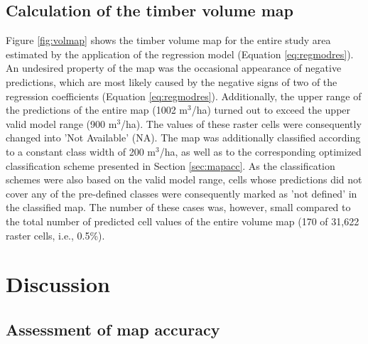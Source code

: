 \subsection{Calculation of the timber volume map}
\label{sec:mapcalc}

Figure \ref{fig:volmap} shows the timber volume map for the entire study area estimated by the application of the regression model (Equation \ref{eq:regmodres}). An undesired property of the map was the occasional appearance of negative predictions, which are most likely caused by the negative signs of two of the regression coefficients (Equation \ref{eq:regmodres}). Additionally, the upper range of the predictions of the entire map (1002 m$^3$/ha) turned out to exceed the upper valid model range (900 m$^3$/ha). The values of these raster cells were consequently changed into 'Not Available' (NA). The map was additionally classified according to a constant class width of 200 m$^3$/ha, as well as to the corresponding optimized classification scheme presented in Section \ref{sec:mapacc}. As the classification schemes were also based on the valid model range, cells whose predictions did not cover any of the pre-defined classes were consequently marked as 'not defined' in the classified map. The number of these cases was, however, small compared to the total number of predicted cell values of the entire volume map (170 of 31,622 raster cells, i.e., 0.5\%).


\section{Discussion}
\label{sec:disc}

\subsection{Assessment of map accuracy}
\label{sec:mapaccass}

